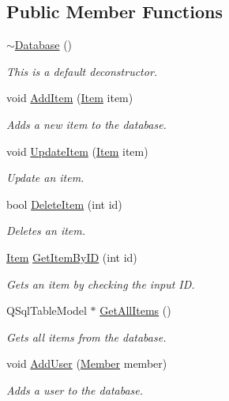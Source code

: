 \subsection*{Public Member Functions}
\begin{DoxyCompactItemize}
\item 
\hyperlink{class_database_a84d399a2ad58d69daab9b05330e1316d}{$\sim$\+Database} ()
\begin{DoxyCompactList}\small\item\em This is a default deconstructor. \end{DoxyCompactList}\item 
void \hyperlink{class_database_a758e61f68f8c15b1cbce3a33a7cf47d6}{Add\+Item} (\hyperlink{class_item}{Item} item)
\begin{DoxyCompactList}\small\item\em Adds a new item to the database. \end{DoxyCompactList}\item 
void \hyperlink{class_database_a30727815c52554ab2c16241a800cad4a}{Update\+Item} (\hyperlink{class_item}{Item} item)
\begin{DoxyCompactList}\small\item\em Update an item. \end{DoxyCompactList}\item 
bool \hyperlink{class_database_a78954f7fa149e4e8b3e67d16b25eaf95}{Delete\+Item} (int id)
\begin{DoxyCompactList}\small\item\em Deletes an item. \end{DoxyCompactList}\item 
\hyperlink{class_item}{Item} \hyperlink{class_database_a6a08b00282577ba5872e5d204a3a8a1f}{Get\+Item\+By\+ID} (int id)
\begin{DoxyCompactList}\small\item\em Gets an item by checking the input ID. \end{DoxyCompactList}\item 
Q\+Sql\+Table\+Model $\ast$ \hyperlink{class_database_af31b0f441345116776e4f79c3944b3c9}{Get\+All\+Items} ()
\begin{DoxyCompactList}\small\item\em Gets all items from the database. \end{DoxyCompactList}\item 
void \hyperlink{class_database_a9989a7c15d345e2158795ae5e07fe162}{Add\+User} (\hyperlink{class_member}{Member} member)
\begin{DoxyCompactList}\small\item\em Adds a user to the database. \end{DoxyCompactList}\item 

\end{DoxyCompactItemize}
